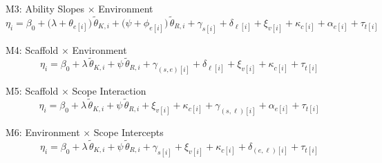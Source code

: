 \bigskip

\begin{hypobox}{M3: Ability Slopes $\times$ Environment}
  \begin{equation*}
    \eta_i
      = \beta_0
      + \bigl(\lambda + \theta_{e[i]}\bigr)\,\tilde{\theta}_{K,i}
      + \bigl(\psi   + \phi_{e[i]}\bigr)\,\tilde{\theta}_{R,i}
      + \gamma_{s[i]}
      + \delta_{\ell[i]}
      + \xi_{v[i]}
      + \kappa_{c[i]}
      + \alpha_{e[i]}
      + \tau_{t[i]}
  \end{equation*}
  \end{hypobox}

\bigskip

\begin{hypobox}{M4: Scaffold $\times$ Environment}
  \begin{equation*}
    \eta_i
      = \beta_0
      + \lambda\,\tilde{\theta}_{K,i}
      + \psi\,\tilde{\theta}_{R,i}
      + \gamma_{(s,e)[i]}
      + \delta_{\ell[i]}
      + \xi_{v[i]}
      + \kappa_{c[i]}
      + \tau_{t[i]}
  \end{equation*}
\end{hypobox}

\bigskip

\begin{hypobox}{M5: Scaffold $\times$ Scope Interaction}
\begin{equation*}
  \eta_i
    = \beta_0
    + \lambda\,\tilde{\theta}_{K,i}
    + \psi\,\tilde{\theta}_{R,i}
    + \xi_{v[i]}
    + \kappa_{c[i]}
    + \gamma_{(s,\ell)[i]}
    + \alpha_{e[i]}
    + \tau_{t[i]}
\end{equation*}
\end{hypobox}

\bigskip

\begin{hypobox}{M6: Environment $\times$ Scope Intercepts}
\begin{equation*}
  \eta_i
    = \beta_0
    + \lambda\,\tilde{\theta}_{K,i}
    + \psi\,\tilde{\theta}_{R,i}
    + \gamma_{s[i]}
    + \xi_{v[i]}
    + \kappa_{c[i]}
    + \delta_{(e,\ell)[i]}
    + \tau_{t[i]}
\end{equation*}
\end{hypobox}

